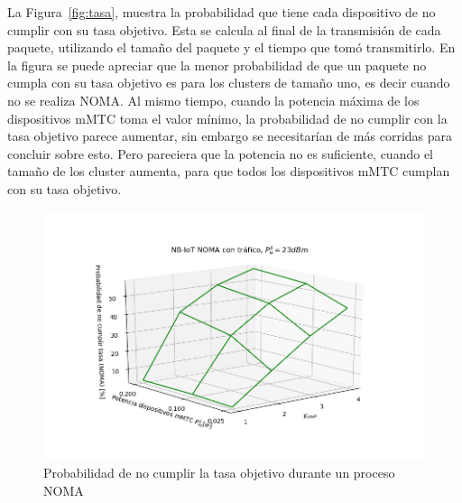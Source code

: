 La Figura~\ref{fig:tasa}, muestra la probabilidad que tiene cada dispositivo de no cumplir con su tasa objetivo. Esta se calcula al final de la transmisión de cada paquete, utilizando el tamaño del paquete y el tiempo que tomó transmitirlo. En la figura se puede apreciar que la menor probabilidad de que un paquete no cumpla con su tasa objetivo es para los clusters de tamaño uno, es decir cuando no se realiza NOMA. Al mismo tiempo, cuando la potencia máxima de los dispositivos mMTC toma el valor mínimo, la probabilidad de no cumplir con la tasa objetivo parece aumentar, sin embargo se necesitarían de más corridas para concluir sobre esto. Pero pareciera que la potencia no es suficiente, cuando el tamaño de los cluster aumenta, para que todos los dispositivos mMTC cumplan con su tasa objetivo. \newline

\break

\begin{figure}[th]
    \centering
    \includegraphics[scale=0.8]{Figures/ResultadosTrafico/Figure_2.png}
    \decoRule
    \caption[Probabilidad de no cumplir la tasa objetivo entre procesos NOMA]{Probabilidad de no cumplir la tasa objetivo durante un proceso NOMA}
    \label{fig:tasaNOMA}
\end{figure}

